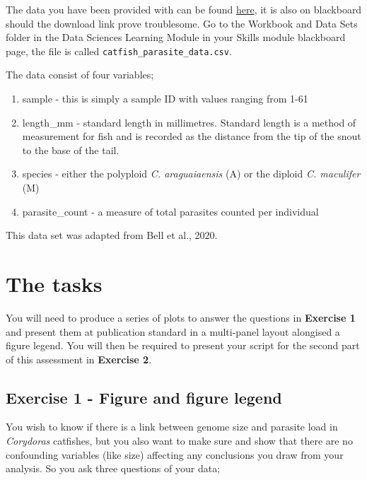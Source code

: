 \documentclass[
]{book}
\providecommand{\tightlist}{%
  \setlength{\itemsep}{0pt}\setlength{\parskip}{0pt}}
\begin{document}
The data you have been provided with can be found \href{https://downgit.github.io/\#/home?url=https://github.com/ellenbell/4008Y/blob/main/data/catfish_parasite_data.csv}{here}, it is also on blackboard should the download link prove troublesome. Go to the Workbook and Data Sets folder in the Data Sciences Learning Module in your Skills module blackboard page, the file is called \texttt{catfish\_parasite\_data.csv}.

The data consist of four variables;

\begin{enumerate}
\def\labelenumi{\arabic{enumi})}
\tightlist
\item
  sample - this is simply a sample ID with values ranging from 1-61
\item
  length\_mm - standard length in millimetres. Standard length is a method of measurement for fish and is recorded as the distance from the tip of the snout to the base of the tail.
\item
  species - either the polyploid \emph{C. araguaiaensis} (A) or the diploid \emph{C. maculifer} (M)
\item
  parasite\_count - a measure of total parasites counted per individual
\end{enumerate}

This data set was adapted from Bell et al., 2020.

\hypertarget{the-tasks}{%
\section{The tasks}\label{the-tasks}}

You will need to produce a series of plots to answer the questions in \textbf{Exercise 1} and present them at publication standard in a multi-panel layout alongised a figure legend. You will then be required to present your script for the second part of this assessment in \textbf{Exercise 2}.

\hypertarget{exercise-1---figure-and-figure-legend}{%
\subsection{Exercise 1 - Figure and figure legend}\label{exercise-1---figure-and-figure-legend}}

You wish to know if there is a link between genome size and parasite load in \emph{Corydoras} catfishes, but you also want to make sure and show that there are no confounding variables (like size) affecting any conclusions you draw from your analysis. So you ask three questions of your data;
\end{document}
